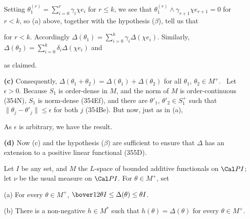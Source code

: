 {Setting $\theta_1^{(r)}=\sum_{i=0}^r\gamma_i\chi e_i$ for $r\le k$, we
see that $\theta_1^{(r)}\wedge\gamma_{r+1}\chi e_{r+1}=0$ for $r<k$, so
(a) above, together with the hypothesis ($\beta$), tell us that


\noindent for $r<k$.   Accordingly
$\Delta(\theta_1)=\sum_{i=0}^k\gamma_i\Delta(\chi e_i)$.   Similarly,
$\Delta(\theta_2)=\sum_{i=0}^k\delta_i\Delta(\chi e_i)$ and


\noindent as claimed.\ \Qed

\medskip

{\bf (c)} Consequently,
$\Delta(\theta_1+\theta_2)=\Delta(\theta_1)+\Delta(\theta_2)$ for all
$\theta_1$, $\theta_2\in M^+$.   \Prf\ Let $\epsilon>0$.   Because $S_1$
is order-dense in $M$, and the norm of $M$ is order-continuous (354N),
$S_1$ is norm-dense (354Ef), and there are $\theta'_1$,
$\theta'_2\in S_1^+$ such that $\|\theta_j-\theta'_j\|\le\epsilon$ for
both $j$ (354Be).   But now, just as in (a),


\noindent As $\epsilon$ is arbitrary, we have the result.\ \Qed

\medskip

{\bf (d)} Now (c) and the hypothesis ($\beta$) are sufficient to ensure
that $\Delta$ has an extension to a positive linear functional (355D).
}%

 Let $I$ be any set, and $M$ the $L$-space of
bounded additive functionals on $\Cal PI$;  let $\nu$ be the usual
measure on $\Cal PI$.   For $\theta\in M^+$, set


(a) For every $\theta\in M^+$,
$\bover12\theta I\le\Delta(\theta)\le\theta I$.

(b) There is a non-negative $h\in M^*$ such that
$h(\theta)=\Delta(\theta)$ for every $\theta\in M^+$.

